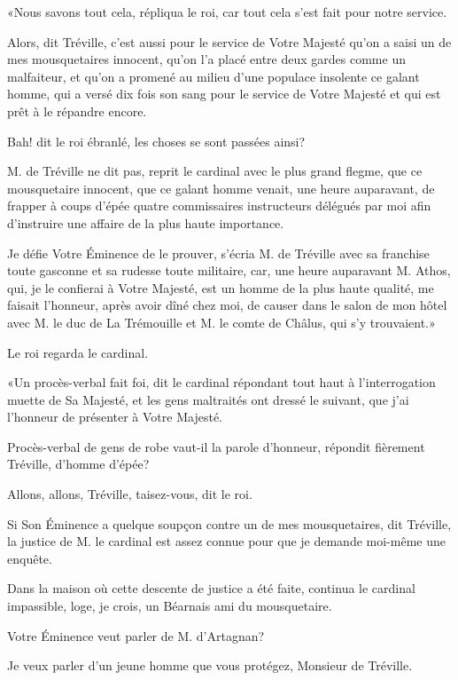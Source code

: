 «Nous savons tout cela, répliqua le roi, car tout cela s'est fait pour notre service. 

\speak  Alors, dit Tréville, c'est aussi pour le service de Votre Majesté qu'on a saisi un de mes mousquetaires innocent, qu'on l'a placé entre deux gardes comme un malfaiteur, et qu'on a promené au milieu d'une populace insolente ce galant homme, qui a versé dix fois son sang pour le service de Votre Majesté et qui est prêt à le répandre encore. 

\speak  Bah! dit le roi ébranlé, les choses se sont passées ainsi? 

\speak  M. de Tréville ne dit pas, reprit le cardinal avec le plus grand flegme, que ce mousquetaire innocent, que ce galant homme venait, une heure auparavant, de frapper à coups d'épée quatre commissaires instructeurs délégués par moi afin d'instruire une affaire de la plus haute importance. 

\speak  Je défie Votre Éminence de le prouver, s'écria M. de Tréville avec sa franchise toute gasconne et sa rudesse toute militaire, car, une heure auparavant M. Athos, qui, je le confierai à Votre Majesté, est un homme de la plus haute qualité, me faisait l'honneur, après avoir dîné chez moi, de causer dans le salon de mon hôtel avec M. le duc de La Trémouille et M. le comte de Châlus, qui s'y trouvaient.» 

Le roi regarda le cardinal. 

«Un procès-verbal fait foi, dit le cardinal répondant tout haut à l'interrogation muette de Sa Majesté, et les gens maltraités ont dressé le suivant, que j'ai l'honneur de présenter à Votre Majesté. 

\speak  Procès-verbal de gens de robe vaut-il la parole d'honneur, répondit fièrement Tréville, d'homme d'épée? 

\speak  Allons, allons, Tréville, taisez-vous, dit le roi. 

\speak  Si Son Éminence a quelque soupçon contre un de mes mousquetaires, dit Tréville, la justice de M. le cardinal est assez connue pour que je demande moi-même une enquête. 

\speak  Dans la maison où cette descente de justice a été faite, continua le cardinal impassible, loge, je crois, un Béarnais ami du mousquetaire. 

\speak  Votre Éminence veut parler de M. d'Artagnan? 

\speak  Je veux parler d'un jeune homme que vous protégez, Monsieur de Tréville. 

